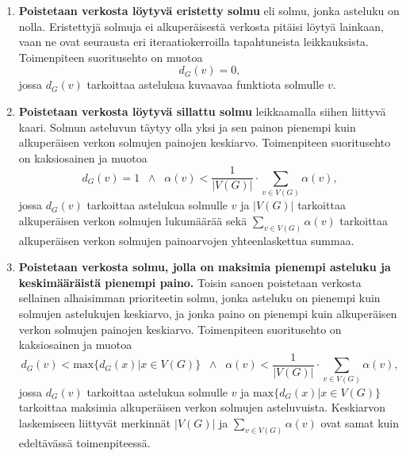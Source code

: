   \begin{enumerate}
    \itemsep1em
    \item \textbf{Poistetaan verkosta löytyvä eristetty solmu} eli solmu, jonka asteluku on nolla.
    Eristettyjä solmuja ei alkuperäisestä verkosta pitäisi löytyä lainkaan, vaan ne ovat seurausta eri iteraatiokerroilla tapahtuneista leikkauksista.
    Toimenpiteen suoritusehto on muotoa
      \begin{equation} \label{eq:5_6_2}
        d_G(v) = 0
        \text{,}
      \end{equation}
    jossa \(d_G(v)\) tarkoittaa astelukua  kuvaavaa funktiota solmulle \(v\).
    \item \textbf{Poistetaan verkosta löytyvä sillattu solmu} leikkaamalla siihen liittyvä kaari.
    Solmun asteluvun täytyy olla yksi ja sen painon pienempi kuin alkuperäisen verkon solmujen painojen keskiarvo.
    Toimenpiteen suoritusehto on kaksiosainen ja muotoa
      \begin{equation} \label{eq:5_6_3}
        d_G(v) = 1 \;\; \land \;\; \alpha(v) < \frac{1}{|V(G)|} \cdot \sum\limits_{v \in V(G)} \alpha(v)
        \text{,}
      \end{equation}
    jossa \(d_G(v)\) tarkoittaa astelukua solmulle \(v\) ja \(|V(G)|\) tarkoittaa alkuperäisen verkon solmujen lukumäärää sekä \(\sum\limits_{v \in V(G)} \alpha(v)\) tarkoittaa alkuperäisen verkon solmujen painoarvojen yhteenlaskettua summaa.
    \item \textbf{Poistetaan verkosta solmu, jolla on maksimia pienempi asteluku ja keskimääräistä pienempi paino.}
    Toisin sanoen poistetaan verkosta sellainen alhaisimman prioriteetin solmu, jonka asteluku on pienempi kuin solmujen astelukujen keskiarvo, ja jonka paino on pienempi kuin alkuperäisen verkon solmujen painojen keskiarvo.
    Toimenpiteen suoritusehto on kaksiosainen ja muotoa
      \begin{equation} \label{eq:5_6_4}
        d_G(v) < \text{max}\{d_G(x) | x \in V(G)\} \;\; \land \;\; \alpha(v) < \frac{1}{|V(G)|} \cdot \sum\limits_{v \in V(G)} \alpha(v)
        \text{,}
      \end{equation}
    jossa \(d_G(v)\) tarkoittaa astelukua solmulle \(v\) ja \( \text{max}\{d_G(x) | x \in V(G)\}\) tarkoittaa maksimia alkuperäisen verkon solmujen asteluvuista.
    Keskiarvon laskemiseen liittyvät merkinnät \(|V(G)|\) ja \(\sum\limits_{v \in V(G)} \alpha(v)\) ovat samat kuin edeltävässä toimenpiteessä.
  \end{enumerate}

